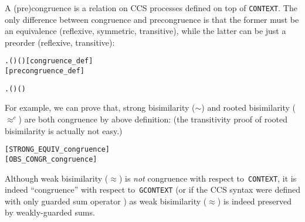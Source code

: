 
A (pre)congruence is a relation on CCS processes defined on top of
\texttt{CONTEXT}. The only difference between congruence and
precongruence is that the former must be an equivalence (reflexive,
symmetric, transitive), while the latter can be just a preorder (reflexive, transitive):
\begin{alltt}
  \HOLSymConst{\HOLTokenEquiv{}}
  \HOLSymConst{\HOLTokenConj{}}
\HOLSymConst{\HOLTokenForall{}}  .   \HOLSymConst{\HOLTokenImp{}}    \HOLSymConst{\HOLTokenImp{}}  ( ) ( )\hfill{[congruence_def]}
\hfill{[precongruence_def]}
\end{alltt}
\vspace{-4ex}
\begin{alltt}
  \HOLSymConst{\HOLTokenEquiv{}}
  \HOLSymConst{\HOLTokenConj{}} \HOLSymConst{\HOLTokenForall{}}  .   \HOLSymConst{\HOLTokenImp{}}    \HOLSymConst{\HOLTokenImp{}}  ( ) ( )
\end{alltt}

For example, we can prove that, strong bisimilarity ($\sim$) and
rooted bisimilarity ($\approx^c$) are both congruence by above
definition: (the transitivity proof of rooted bisimilarity is actually not easy.)
\begin{alltt}
\HOLTokenTurnstile{}  \hfill{[STRONG_EQUIV_congruence]}
\HOLTokenTurnstile{}  \hfill{[OBS_CONGR_congruence]}
\end{alltt}

Although weak bisimilarity ($\approx$) is \emph{not} congruence
  with respect to~\texttt{CONTEXT}, it is indeed ``congruence''
  with respect to~\texttt{GCONTEXT} (or if the CCS syntax were defined with
  only guarded sum operator \cite{sangiorgi2015equations}) as weak
  bisimilarity ($\approx$) is indeed preserved by 
  weakly-guarded sums.


  